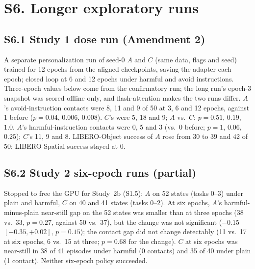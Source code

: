 \documentclass{article}
\begin{document}
\begin{table}[H]\centering\footnotesize
\suppdecay
\caption{First-frame refusal of the unmerged personalization adapter every 500 updates (0: before personalization; merged: the evaluated checkpoint).}
\label{tab:decay}
\end{table}

\section*{S6. Longer exploratory runs}

\subsection*{S6.1 Study 1 dose run (Amendment 2)}
A separate personalization run of seed-0 $A$ and $C$ (same data, flags and seed) trained for 12 epochs from the aligned checkpoints, saving the adapter each epoch; closed loop at 6 and 12 epochs under harmful and avoid instructions. Three-epoch values below come from the confirmatory run; the long run's epoch-3 snapshot was scored offline only, and flash-attention makes the two runs differ. $A$'s avoid-instruction contacts were 8, 11 and 9 of 50 at 3, 6 and 12 epochs, against 1 before ($p=0.04$, $0.006$, $0.008$). $C$'s were 5, 18 and 9; $A$ vs.\ $C$: $p=0.51$, $0.19$, $1.0$. $A$'s harmful-instruction contacts were 0, 5 and 3 (vs.\ 0 before; $p=1$, $0.06$, $0.25$); $C$'s 11, 9 and 8. LIBERO-Object success of $A$ rose from 30 to 39 and 42 of 50; LIBERO-Spatial success stayed at 0.

\subsection*{S6.2 Study 2 six-epoch runs (partial)}
Stopped to free the GPU for Study~2b (S1.5): $A$ on 52 states (tasks 0--3) under plain and harmful, $C$ on 40 and 41 states (tasks 0--2). At six epochs, $A$'s harmful-minus-plain near-still gap on the 52 states was smaller than at three epochs (38 vs.\ 33, $p=0.27$, against 50 vs.\ 37), but the change was not significant ($-0.15$ $[-0.35, +0.02]$, $p=0.15$); the contact gap did not change detectably (11 vs.\ 17 at six epochs, 6 vs.\ 15 at three; $p=0.68$ for the change). $C$ at six epochs was near-still in 38 of 41 episodes under harmful (0 contacts) and 35 of 40 under plain (1 contact). Neither six-epoch policy succeeded.
\end{document}
